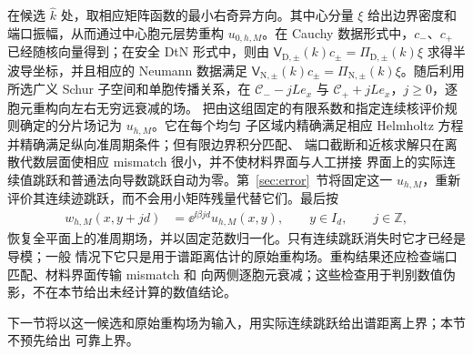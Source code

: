在候选 $\widehat k$ 处，取相应矩阵函数的最小右奇异方向。其中心分量 $\xi$ 给出边界密度和
端口振幅，从而通过中心胞元层势重构 $u_{0,h,M}$。在 Cauchy 数据形式中，$c_-$、$c_+$
已经随核向量得到；在安全 DtN 形式中，则由
$\mathsf V_{\mathrm D,\pm}(k)c_\pm
=\Pi_{\mathrm D,\pm}(k)\xi$ 求得半波导坐标，并且相应的 Neumann 数据满足
$\mathsf V_{\mathrm N,\pm}(k)c_\pm
  =\Pi_{\mathrm N,\pm}(k)\xi$。随后利用所选广义 Schur 子空间和单胞传播关系，在
$\mathcal C_--jLe_x$ 与 $\mathcal C_++jLe_x$，$j\geq0$，逐胞元重构向左右无穷远衰减的场。
把由这组固定的有限系数和指定连续核评价规则确定的分片场记为 $u_{h,M}$。它在每个均匀
子区域内精确满足相应 Helmholtz 方程并精确满足纵向准周期条件；但有限边界积分匹配、
端口截断和近核求解只在离散代数层面使相应 mismatch 很小，并不使材料界面与人工拼接
界面上的实际连续值跳跃和普通法向导数跳跃自动为零。第~\ref{sec:error}~节将固定这一
$u_{h,M}$，重新评价其连续迹跳跃，而不会用小矩阵残量代替它们。最后按
\begin{align}
  w_{h,M}(x,y+jd)
  &=\ee^{\ii\beta jd}u_{h,M}(x,y),
  \qquad y\in I_d,\qquad j\in\mathbb Z,
  \label{eq:numerical-guided-mode-extension}
\end{align}
恢复全平面上的准周期场，并以固定范数归一化。只有连续跳跃消失时它才已经是导模；一般
情况下它只是用于谱距离估计的原始重构场。重构结果还应检查端口匹配、材料界面传输 mismatch 和
向两侧逐胞元衰减；这些检查用于判别数值伪影，不在本节给出未经计算的数值结论。

下一节将以这一候选和原始重构场为输入，用实际连续跳跃给出谱距离上界；本节不预先给出
可靠上界。
